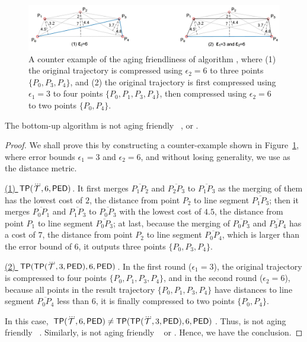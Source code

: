 \begin{figure}
	\centering
	\includegraphics[scale=0.66]{Figures/Fig-aging-pavlidis.jpg}

	\caption{\small A counter example of the aging friendliness of algorithm \tpa, where (1) the original trajectory is compressed using $\epsilon_2=6$ to three points $\{P_0, P_3, P_4\}$, and (2) the original trajectory is first compressed using $\epsilon_1=3$ to four points $\{P_0, P_1, P_3, P_4\}$, then compressed using $\epsilon_2=6$ to two points $\{P_0, P_4\}$. }
	\vspace{-1ex}
	\label{fig:aging-pavlidis}
\end{figure}


\begin{proposition}
\label{theo-aging-tp}
The bottom-up algorithm \tpa is not aging friendly \wrt~\ped, \sed or \dad.
\end{proposition}

\begin{proof}
	We shall prove this by constructing a counter-example shown in Figure~\ref{fig:aging-pavlidis}, where error bounds $\epsilon_1 =3$ and $\epsilon_2=6$, and without losing generality, we use \ped as the distance metric.

\underline{(1) ${{\mathsf{TP}}}(\dddot{\mathcal{T}}, 6, {\mathsf{PED}})$}. It first merges $\overline{P_1P_2}$ and $\overline{P_2P_3}$ to $\overline{P_1P_3}$ as the merging of them has the lowest cost of $2$, the distance from point $P_2$ to line segment $\overline{P_1P_3}$; then it merges $\overline{P_0P_1}$ and $\overline{P_1P_3}$ to $\overline{P_0P_3}$ with the lowest cost of $4.5$, the distance from point $P_1$ to line segment $\overline{P_0P_3}$; at last, because the merging of $\overline{P_0P_3}$ and $\overline{P_3P_4}$ has a cost of $7$, the distance from point $P_2$ to line segment $\overline{P_0P_4}$, which is larger than the error bound of $6$, it outputs three points $\{P_0, P_3, P_4\}$.

\underline{(2) ${{\mathsf{TP}}}({\mathsf{TP}}(\dddot{\mathcal{T}}, 3, {\mathsf{PED}}), 6, {\mathsf{PED}})$}. In the first round ($\epsilon_1=3$), the original trajectory is compressed to four points $\{P_0, P_1, P_3, P_4\}$, and in the second round ($\epsilon_2=6$), because all points in the result trajectory $\{P_0, P_1, P_3, P_4\}$ have distances to line segment $\overline{P_0P_4}$ less than $6$, it is finally compressed to two points $\{P_0, P_4\}$.

In this case, ${{\mathsf{TP}}}(\dddot{\mathcal{T}}, 6, {\mathsf{PED}}) \ne {{\ensuremath {\mathsf{TP}}}}({\mathsf{TP}}(\dddot{\mathcal{T}}, 3, {\mathsf{PED}}), 6, {\mathsf{PED}})$. Thus, \tpa is not aging friendly \wrt~\ped.
Similarly, \tpa is not aging friendly \wrt~ \sed or \dad. Hence, we have the conclusion.
\end{proof}


